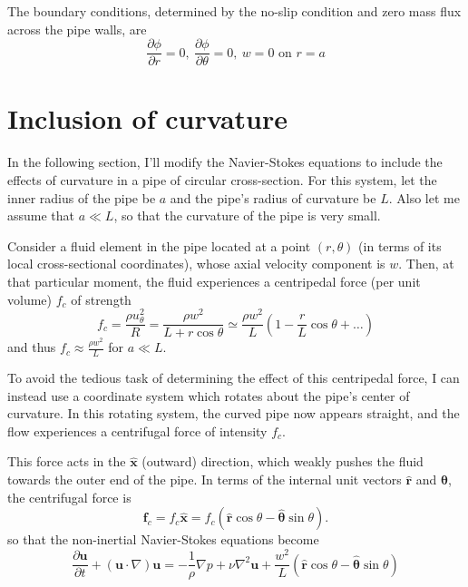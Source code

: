\documentclass[10pt,a4paper]{report}
\begin{document}
The boundary conditions, determined by the no-slip condition and zero mass flux across the pipe walls, are
\begin{equation*}
\frac{\partial \phi}{\partial r} = 0, \ \frac{\partial \phi}{\partial \theta} = 0, \ w = 0 \textrm{ on } r = a
\end{equation*}

\section{Inclusion of curvature}

In the following section, I'll modify the Navier-Stokes equations to include the effects of curvature in a pipe of circular cross-section. For this system, let the  inner radius of the pipe be $a$ and the pipe's radius of curvature be $L$. Also let me assume that $a \ll L$, so that the curvature of the pipe is very small.

Consider a fluid element in the pipe located at a point $(r, \theta)$ (in terms of its local cross-sectional coordinates), whose axial velocity component is $w$. Then, at that particular moment, the fluid experiences a centripedal force (per unit volume) $f_c$ of strength
\begin{equation*}
f_c = \frac{\rho u_\theta^2}{R} = \frac{\rho w^2}{L + r \cos \theta} \simeq \frac{\rho w^2}{L} (1 - \frac{r}{L} \cos \theta + \ldots)
\end{equation*}
and thus $f_c \approx \frac{\rho w^2}{L}$ for $a \ll L$.

To avoid the tedious task of determining the effect of this centripedal force, I can instead use a coordinate system which rotates about the pipe's center of curvature. In this rotating system, the curved pipe now appears straight, and the flow experiences a centrifugal force of intensity $f_c$.

This force acts in the $\hat{\bm{x}}$ (outward) direction, which weakly pushes the fluid towards the outer end of the pipe. In terms of the internal unit vectors $\hat{\bm{r}}$ and $\hat{\bm{\theta}}$, the centrifugal force is
\begin{equation*}
\bm{f}_c = f_c \hat{\bm{x}} = f_c (\hat{\bm{r}} \cos \theta - \hat{\bm{\theta}} \sin \theta).
\end{equation*}
so that the non-inertial Navier-Stokes equations become
\begin{equation}\label{navstokesi}
\frac{\partial \bm{u}}{\partial t} + (\bm{u} \cdot \nabla) \bm{u} = -\frac{1}{\rho} \nabla p + \nu \nabla^2 \bm{u} + \frac{w^2}{L} (\hat{\bm{r}} \cos \theta - \hat{\bm{\theta}} \sin \theta)
\end{equation}
\end{document}
